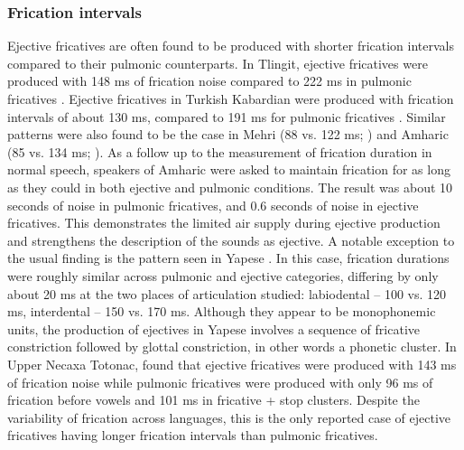 \documentclass[output=paper,colorlinks,citecolor=brown]{langscibook}
\begin{document}
\subsubsection{Frication intervals}
Ejective fricatives are often found to be produced with shorter frication intervals compared to their pulmonic counterparts. In Tlingit, ejective fricatives were produced with 148 ms of frication noise compared to 222 ms in pulmonic fricatives \citep{Maddieson2001a}. Ejective fricatives in Turkish Kabardian were produced with frication intervals of about 130 ms, compared to 191 ms for pulmonic fricatives \citep{Gordon2006}. Similar patterns were also found to be the case in Mehri (88 vs. 122 ms; \citealt{Ridouane2015,Ridouane2017}) and Amharic (85 vs. 134 ms; \citealt{Demolin2002,Seid2009}). As a follow up to the measurement of frication duration in normal speech, speakers of Amharic were asked to maintain frication for as long as they could in both ejective and pulmonic conditions. The result was about 10 seconds of noise in pulmonic fricatives, and 0.6 seconds of noise in ejective fricatives. This demonstrates the limited air supply during ejective production and strengthens the description of the sounds as ejective. A notable exception to the usual finding is the pattern seen in Yapese \citep{Maddieson1998}. In this case, frication durations were roughly similar across pulmonic and ejective categories, differing by only about 20 ms at the two places of articulation studied: labiodental -- 100 vs. 120 ms, interdental -- 150 vs. 170 ms. Although they appear to be monophonemic units, the production of ejectives in Yapese involves a sequence of fricative constriction followed by glottal constriction, in other words a phonetic cluster. In Upper Necaxa Totonac, \citet{Beck2006} found that ejective fricatives were produced with 143 ms of frication noise while pulmonic fricatives were produced with only 96 ms of frication before vowels and 101 ms in fricative + stop clusters. Despite the variability of frication across languages, this is the only reported case of ejective fricatives having longer frication intervals than pulmonic fricatives. 
\end{document}
